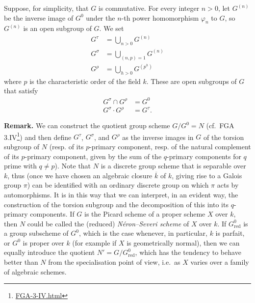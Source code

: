 \documentclass{article}
\renewcommand{\href}[2]{#2\footnote{\url{#1}}}
\newenvironment{rmenv}[1]
  {\phantomsection\par\smallskip\noindent\textbf{#1.}\rmfamily}
  {\par\smallskip}
\newcommand{\oldpage}[1]{\marginpar{\footnotesize$\Big\vert$ \textit{p.~#1}}}
\theoremstyle{definition}
\theoremstyle{definition}
\theoremstyle{definition}
\theoremstyle{definition}
\theoremstyle{remark}
\begin{document}
Suppose, for simplicity, that \(G\) is commutative.
For every integer \(n>0\), let \(G^{(n)}\) be the inverse image of \(G^0\) under the \(n\)-th power homomorphism \(\varphi_n\) to \(G\), so \(G^{(n)}\) is an open subgroup of \(G\).
We set
\[
  \begin{aligned}
    G^\tau
    &= \bigcup_{n>0} G^{(n)}
  \\G^\sigma
    &= \bigcup_{(n,p)=1} G^{(n)}
  \\G^\rho
    &= \bigcup_{h>0} G^{(p^h)}
  \end{aligned}
\]
where \(p\) is the characteristic order of the field \(k\).
\oldpage{236-03}These are open subgroups of \(G\) that satisfy
\[
  \begin{aligned}
    G^\sigma \cap G^\rho
    &= G^0
  \\G^\sigma \cdot G^\rho
    &= G^\tau.
  \end{aligned}
\]

\leavevmode{}%
\begin{rmenv}{Remark}
We can construct the quotient group scheme \(G/G^0=N\) (cf.~\href{FGA-3-IV.html}{FGA 3.IV}) and then define \(G^\tau\), \(G^\sigma\), and \(G^\rho\) as the inverse images in \(G\) of the torsion subgroup of \(N\) (resp. of its \(p\)-primary component, resp. of the natural complement of its \(p\)-primary component, given by the sum of the \(q\)-primary components for \(q\) prime with \(q\neq p\)).
Note that \(N\) is a discrete group scheme that is separable over \(k\), thus (once we have chosen an algebraic closure \(\overline{k}\) of \(k\), giving rise to a Galois group \(\pi\)) can be identified with an ordinary discrete group on which \(\pi\) acts by automorphisms.
It is in this way that we can interpret, in an evident way, the construction of the torsion subgroup and the decomposition of this into its \(q\)-primary components.
If \(G\) is the Picard scheme of a proper scheme \(X\) over \(k\), then \(N\) could be called the (reduced) \emph{Néron--Severi scheme} of \(X\) over \(k\).
If \(G_\mathrm{red}^0\) is a group subscheme of \(G^0\), which is the case whenever, in particular, \(k\) is parfait, or \(G^0\) is proper over \(k\) (for example if \(X\) is geometrically normal), then we can equally introduce the quotient \(N'=G/G_\mathrm{red}^0\), which has the tendency to behave better than \(N\) from the specialisation point of view, i.e.~as \(X\) varies over a family of algebraic schemes.

\end{rmenv}
\end{document}
